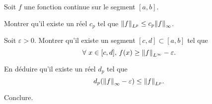 \begin{exercice}
Soit $f$ une fonction continue sur le segment $[a, b]$.
\begin{questions}
\item Montrer qu'il existe un réel $c_p$ tel que $\norm{f}_{L^p} \leq c_p \norm{f}_\infty$.

\item Soit $\varepsilon > 0$. Montrer qu'il existe un segment $[c, d] \subset [a, b]$ tel que
\[
\forall\, x \in [c, d],\, f(x) \geq \norm{f}_{L^\infty} - \varepsilon.
\]

\item En déduire qu'il existe un réel $d_p$ tel que
\[
d_p (\norm{f}_\infty - \varepsilon) \leq \norm{f}_{L^p}.
\]

\item Conclure.
\end{questions}
\end{exercice}

